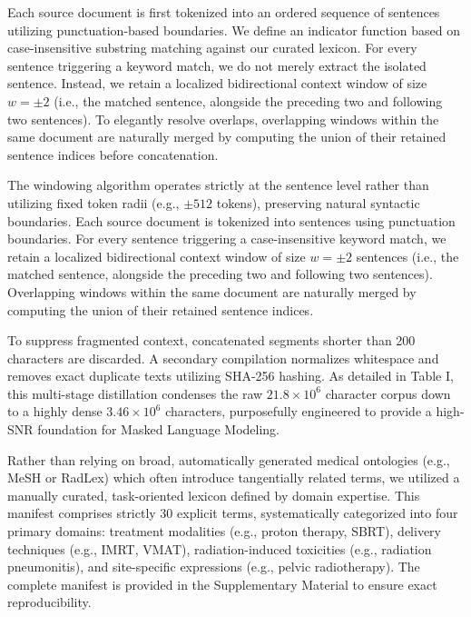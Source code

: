 \documentclass[a4paper,fleqn]{cas-dc}
\begin{document}
Each source document is first tokenized into an ordered sequence of sentences utilizing punctuation-based boundaries. We define an indicator function based on case-insensitive substring matching against our curated lexicon. For every sentence triggering a keyword match, we do not merely extract the isolated sentence. Instead, we retain a localized bidirectional context window of size $w = \pm 2$ (i.e., the matched sentence, alongside the preceding two and following two sentences). To elegantly resolve overlaps, overlapping windows within the same document are naturally merged by computing the union of their retained sentence indices before concatenation.

The windowing algorithm operates strictly at the sentence level rather than utilizing fixed token radii (e.g., $\pm 512$ tokens), preserving natural syntactic boundaries. Each source document is tokenized into sentences using punctuation boundaries. For every sentence triggering a case-insensitive keyword match, we retain a localized bidirectional context window of size $w = \pm 2$ sentences (i.e., the matched sentence, alongside the preceding two and following two sentences). Overlapping windows within the same document are naturally merged by computing the union of their retained sentence indices.

To suppress fragmented context, concatenated segments shorter than 200 characters are discarded. A secondary compilation normalizes whitespace and removes exact duplicate texts utilizing SHA-256 hashing. As detailed in Table I, this multi-stage distillation condenses the raw $21.8 \times 10^6$ character corpus down to a highly dense $3.46 \times 10^6$ characters, purposefully engineered to provide a high-SNR foundation for Masked Language Modeling.

Rather than relying on broad, automatically generated medical ontologies (e.g., MeSH or RadLex) which often introduce tangentially related terms, we utilized a manually curated, task-oriented lexicon defined by domain expertise. This manifest comprises strictly 30 explicit terms, systematically categorized into four primary domains: treatment modalities (e.g., proton therapy, SBRT), delivery techniques (e.g., IMRT, VMAT), radiation-induced toxicities (e.g., radiation pneumonitis), and site-specific expressions (e.g., pelvic radiotherapy). The complete manifest is provided in the Supplementary Material to ensure exact reproducibility.
\end{document}
